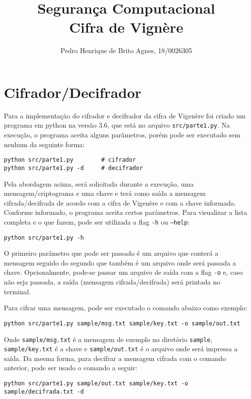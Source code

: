 \documentclass[12pt]{article}
\title{\textbf{Segurança Computacional\\ \Large{Cifra de Vignère}}}
\author{Pedro Henrique de Brito Agnes, 18/0026305 \vspace{-2ex}}
\affil{Dep. Ciência da Computação - Universidade de Brasília (UnB) \vspace{-2ex}}
\date{}
\begin{document}
\maketitle

\section{Cifrador/Decifrador}
Para a implementação do cifrador e decifrador da cifra de Vigenère foi criado um programa em python na versão 3.6, que está no arquivo \texttt{src/parte1.py}. Na execução, o programa aceita alguns parâmetros, porém pode ser executado sem nenhum da seguinte forma:

\begin{lstlisting}
python src/parte1.py        # cifrador
python src/parte1.py -d     # decifrador
\end{lstlisting}

Pela abordagem acima, será solicitada durante a execução, uma mensagem/criptograma e uma chave e terá como saída a mensagem cifrada/decifrada de acordo com a cifra de Vigenère e com a chave informada. Conforme informado, o programa aceita certos parâmetros. Para visualizar a lista completa e o que fazem, pode ser utilizada a flag \texttt{-h} ou \texttt{--help}:

\begin{lstlisting}
python src/parte1.py -h
\end{lstlisting}

O primeiro parâmetro que pode ser passado é um arquivo que conterá a mensagem seguido do segundo que também é um arquivo onde será passada a chave. Opcionalmente, pode-se passar um arquivo de saída com a flag \texttt{-o} e, caso não seja passada, a saída (mensagem cifrada/decifrada) será printada no terminal.

Para cifrar uma mensagem, pode ser executado o comando abaixo como exemplo:

\begin{lstlisting}
python src/parte1.py sample/msg.txt sample/key.txt -o sample/out.txt
\end{lstlisting}

Onde \texttt{sample/msg.txt} é a mensagem de exemplo no diretório \texttt{sample}, \texttt{sample/key.txt} é a chave e \texttt{sample/out.txt} é o arquivo onde será impressa a saída. Da mesma forma, para decifrar a mensagem cifrada com o comando anterior, pode ser usado o comando a seguir:

\begin{lstlisting}
python src/parte1.py sample/out.txt sample/key.txt -o sample/decifrada.txt -d
\end{lstlisting}
\end{document}
